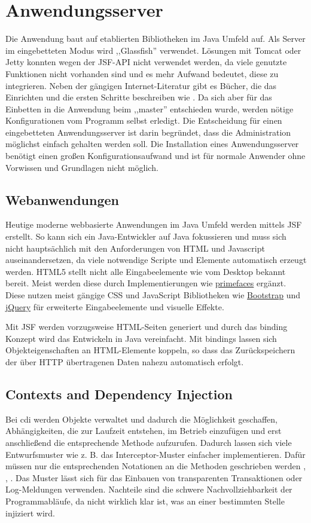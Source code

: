 \documentclass[oneside, ngerman, toc=bibliography,bibliography=totoc,listof=entryprefix, open=right,numbers=noenddot,fontsize=12pt]{scrbook}
\begin{document}
\section{Anwendungsserver}
\label{chap:appserv}
Die Anwendung baut auf etablierten Bibliotheken im Java Umfeld auf. Als Server im eingebetteten Modus wird ,,Glassfish'' verwendet.
Lösungen mit Tomcat oder Jetty konnten wegen der JSF-API nicht verwendet werden, da viele genutzte Funktionen nicht vorhanden sind und es mehr Aufwand bedeutet, diese zu integrieren. Neben der gängigen Internet-Literatur gibt es Bücher, die das Einrichten und die ersten Schritte beschreiben wie \cite{glassfishee7}. Da sich aber für das Einbetten in die Anwendung beim ,,master'' entschieden wurde, werden nötige Konfigurationen vom Programm selbst erledigt.
Die Entscheidung für einen eingebetteten Anwendungsserver ist darin begründet, dass die Administration möglichst einfach gehalten werden soll.
Die Installation eines Anwendungsserver benötigt einen großen Konfigurationsaufwand und ist für normale Anwender ohne Vorwissen und Grundlagen nicht möglich.


\subsection{Webanwendungen}
Heutige moderne webbasierte Anwendungen im Java Umfeld werden mittels {JSF} erstellt. So kann sich ein Java-Entwickler auf Java fokussieren und muss sich nicht hauptsächlich mit den Anforderungen von HTML und Javascript auseinandersetzen, da viele notwendige Scripte und Elemente automatisch erzeugt werden. HTML5 stellt nicht alle Eingabeelemente wie vom Desktop bekannt bereit. Meist werden diese durch Implementierungen wie \href{http://primefaces.org/}{{primefaces}} ergänzt. Diese nutzen meist gängige {CSS} und {JavaScript} Bibliotheken wie \href{http://getbootstrap.com/}{Bootstrap} und \href{https://jquery.com/}{jQuery} für erweiterte Eingabeelemente und visuelle Effekte.

Mit JSF  werden vorzugsweise HTML-Seiten generiert und durch das binding Konzept wird das Entwickeln in Java vereinfacht.
Mit bindings lassen sich Objekteigenschaften an HTML-Elemente koppeln, so dass das Zurückspeichern der über HTTP übertragenen Daten nahezu automatisch erfolgt.

\subsection{Contexts and Dependency Injection}
Bei \acrfull{cdi} werden Objekte verwaltet und dadurch die Möglichkeit geschaffen, Abhängigkeiten, die zur Laufzeit entstehen, im Betrieb einzufügen und erst anschließend die entsprechende Methode aufzurufen. Dadurch lassen sich viele Entwurfsmuster wie z. B. das Interceptor-Muster einfacher implementieren. Dafür müssen nur die entsprechenden Notationen an die Methoden geschrieben werden \cite{schmidt2002pattern}, \cite{gamma2011entwurfsmuster}, \cite{bien2003j2ee}. Das Muster lässt sich für das Einbauen von transparenten Transaktionen oder Log-Meldungen verwenden. Nachteile sind die schwere Nachvollziehbarkeit der Programmabläufe, da nicht wirklich klar ist, was an einer bestimmten Stelle injiziert wird.
\end{document}
